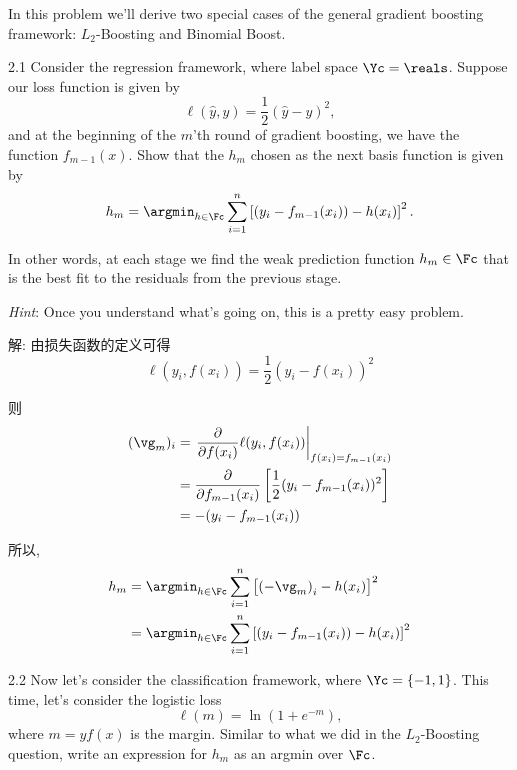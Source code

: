 \documentclass[openany]{ctexbook}
\theoremstyle{kaiti}
\theoremstyle{normal}
\begin{document}
In this problem we'll derive two special cases of the general gradient boosting framework: $L_{2}$-Boosting and Binomial Boost. 

2.1 Consider the regression framework, where label space $\Yc=\reals$. Suppose our loss function is given by 
\begin{equation}
  \ell(\hat{y},y)=\frac{1}{2}\left(\hat{y}-y\right)^{2},
\end{equation}
and at the beginning of the $m$'th round of gradient boosting, we have the function $f_{m-1}(x)$. Show that the $h_{m}$ chosen as the next basis function is given by 
\begin{equation}
  h_{m}=\argmin_{h\in\Fc}\sum_{i=1}^{n}\left[\left(y_{i}-f_{m-1}(x_{i})\right)-h(x_{i})\right]^{2}.
\end{equation}

In other words, at each stage we find the weak prediction function $h_{m}\in\Fc$ that is the best fit to the residuals from the previous stage. 

\emph{Hint}: Once you understand what's going on, this is a pretty easy problem.

解: 由损失函数的定义可得
\begin{equation}
  \ell(y_{i},f(x_{i}))
  =\frac{1}{2}(y_{i}-f(x_{i}))^2
\end{equation}

则
\begin{equation}
  \begin{aligned}
    ({\vg}_{m})_i
    &=\left.\frac{\partial}{\partial f(x_{i})}\ell(y_{i},f(x_{i})) \right|_{f(x_{i})=f_{m-1}(x_{i})}\\
    &=\frac{\partial}{\partial f_{m-1}(x_{i})}\left[\frac{1}{2}(y_{i}-f_{m-1}(x_{i}))^2\right]\\
    &=-(y_{i}-f_{m-1}(x_{i}))\\
  \end{aligned}
\end{equation}

所以,
\begin{equation}
  \begin{aligned}
    h_{m}
    &=\argmin_{h\in\Fc}\sum_{i=1}^{n}\left[\left(-{\vg}_{m}\right)_{i}-h(x_{i})\right]^{2}\\
    &=\argmin_{h\in\Fc}\sum_{i=1}^{n}\left[(y_{i}-f_{m-1}(x_{i}))-h(x_{i})\right]^{2}\\
  \end{aligned}
\end{equation}

2.2 Now let's consider the classification framework, where $\Yc=\{-1,1\} $. This time, let's consider the logistic loss 
\begin{equation}
  \ell(m)=\ln\left(1+e^{-m}\right),
\end{equation}
where $m=yf(x)$ is the margin. Similar to what we did in the $L_{2}$-Boosting question, write an expression for $h_{m}$ as an argmin over $\Fc$. 
\end{document}

